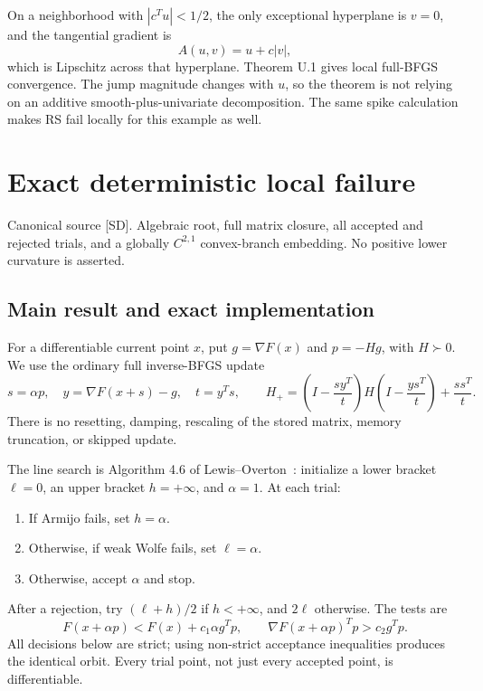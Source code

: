 \documentclass[10pt,oneside,openany]{book}
\newcommand{\ModuleTag}{I}
\theoremstyle{remark}\newtheorem{remark}{Remark}[chapter]
\newcommand{\StartModule}[3]{\cleardoublepage\renewcommand{\ModuleTag}{#1}\chapter{#2}\label{#1:chapter}\begin{small}\color{Accent}#3\end{small}\par\vspace{3pt}{\color{RuleGray}\hrule}\vspace{9pt}}
\begin{document}
On a neighborhood with \(|c^Tu|<1/2\), the only exceptional hyperplane
is \(v=0\), and the tangential gradient is \[
 A(u,v)=u+c|v|,
\] which is Lipschitz across that hyperplane. Theorem U.1 gives local
full-BFGS convergence. The jump magnitude changes with \(u\), so the
theorem is not relying on an additive smooth-plus-univariate
decomposition. The same spike calculation makes RS fail locally for this
example as well.


\endgroup


\StartModule{D}{Exact deterministic local failure}{Canonical source [SD]. Algebraic root, full matrix closure, all accepted and rejected trials, and a globally $C^{2,1}$ convex-branch embedding. No positive lower curvature is asserted.}

\begingroup
\providecommand{\R}{}
\renewcommand{\R}{\mathbb R}
\providecommand{\B}{}
\renewcommand{\B}{\mathcal B}
\providecommand{\I}{}
\renewcommand{\I}{I}
\setcounter{section}{0}
\setcounter{theorem}{0}
\setcounter{lemma}{0}
\setcounter{corollary}{0}
\setcounter{proposition}{0}
\setcounter{remark}{0}
\setcounter{equation}{0}
\section{Main result and exact implementation}
For a differentiable current point $x$, put $g=\nabla F(x)$ and $p=-Hg$, with $H\succ0$. We use the ordinary full inverse-BFGS update
\begin{equation}\label{D:bfgs}
 s=\alpha p,\quad y=\nabla F(x+s)-g,\quad t=y^Ts,\qquad
 H_+=\left(I-\frac{sy^T}{t}\right)H\left(I-\frac{ys^T}{t}\right)+\frac{ss^T}{t}.
\end{equation}
There is no resetting, damping, rescaling of the stored matrix, memory truncation, or skipped update.

The line search is Algorithm 4.6 of Lewis--Overton~\cite{LO}: initialize a lower bracket $\ell=0$, an upper bracket $h=+\infty$, and $\alpha=1$. At each trial:
\begin{enumerate}
\item If Armijo fails, set $h=\alpha$.
\item Otherwise, if weak Wolfe fails, set $\ell=\alpha$.
\item Otherwise, accept $\alpha$ and stop.
\end{enumerate}
After a rejection, try $(\ell+h)/2$ if $h<+\infty$, and $2\ell$ otherwise. The tests are
\[
 F(x+\alpha p)<F(x)+c_1\alpha g^Tp,
 \qquad \nabla F(x+\alpha p)^Tp>c_2g^Tp.
\]
All decisions below are strict; using non-strict acceptance inequalities produces the identical orbit. Every trial point, not just every accepted point, is differentiable.
\end{document}
